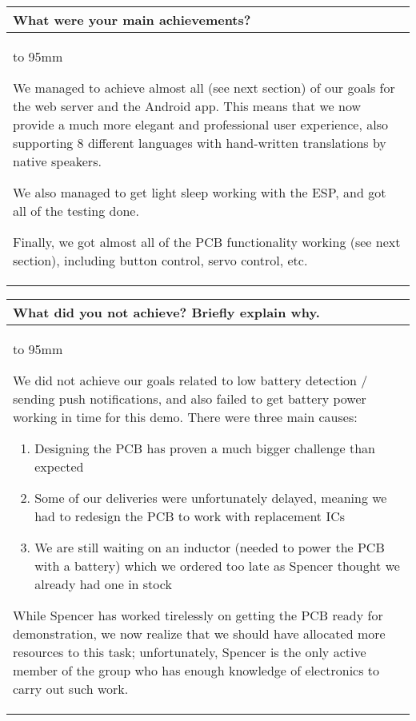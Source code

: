\documentclass[a4paper]{article}
\newcommand{\colWidth}{141mm}
\begin{document}
\begin{center}

\begin{tabular}{|p{\colWidth}|}
	\hline
	\cellcolor{blue!25}\large
	\textbf{What were your main achievements?}
	\\ \hline
	\vtop to 95mm{
		We managed to achieve almost all (see next section) of our goals for the web server and the Android app.
		This means that we now provide a much more elegant and professional user experience,
		also supporting 8 different languages with hand-written translations by native speakers.

		\vspace{3mm}

		We also managed to get light sleep working with the ESP, and got all of the testing done.

		\vspace{3mm}
		
		Finally, we got almost all of the PCB functionality working (see next section), including button control,
		servo control, etc.






  }
  \\
  \hline
\end{tabular}
\vskip 5mm


\begin{tabular}{|p{\colWidth}|}
	\hline
	\cellcolor{blue!25}\large
	\textbf{What did you not achieve? Briefly explain why.}
	\\ \hline
	\vtop to 95mm{
		We did not achieve our goals related to low battery detection / sending push notifications, and also failed to get
		battery power working in time for this demo. There were three main causes:
		\begin{enumerate}
			\item Designing the PCB has proven a much bigger challenge than expected 
			\item Some of our deliveries were unfortunately delayed, meaning we had to redesign the PCB to work with replacement ICs
			\item We are still waiting on an inductor (needed to power the PCB with a battery) which we ordered too late as Spencer thought we already had one in stock
		\end{enumerate}

		While Spencer has worked tirelessly on getting the PCB ready for demonstration, we now realize
		that we should have allocated more resources to this task; unfortunately, Spencer is the only
		active member of the group who has enough knowledge of electronics to carry out such work.

}
\end{tabular}
\end{center}
\end{document}
